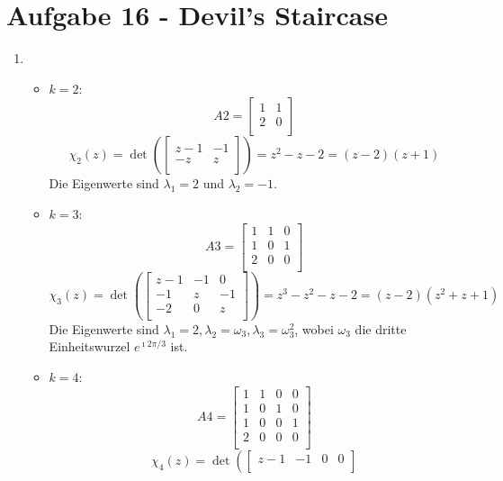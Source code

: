\section*{Aufgabe 16 - Devil's Staircase}
\begin{enumerate}
\item
	\begin{itemize}
		\item $k= 2$: 
			\[ A2 = \begin{bmatrix}
					1 & 1 \\
					2 & 0 \\
				\end{bmatrix} \]
			\[ \chi_2(z) = \det \left( 
				\begin{bmatrix}
					z - 1 & -1 \\
					-z    & z  \\
				\end{bmatrix} \right) =
				z^2 - z - 2 = (z-2)(z+1) \]
			Die Eigenwerte sind $\lambda_1 = 2$ und $\lambda_2 = -1$.
		\item $k = 3$:
			\[ A3 = \begin{bmatrix}
					1 & 1 & 0 \\
					1 & 0 & 1 \\
					2 & 0 & 0 \\
				\end{bmatrix} \]
			\[ \chi_3(z) = \det \left(
				\begin{bmatrix}
					z-1 & -1 & 0 \\
					-1 & z & -1 \\
					-2 & 0 & z \\
				\end{bmatrix} \right) =
				z^3 - z^2 - z - 2 = (z-2)(z^2 + z + 1) \]
			Die Eigenwerte sind $\lambda_1 = 2, \lambda_2 = \omega_3, \lambda_3 = \omega_3^2 $,
			wobei $\omega_3$ die dritte Einheitswurzel $e^{\imath 2 \pi / 3}$ ist.
		\item $k = 4$:
			\[ A4 =	\begin{bmatrix}
					1 & 1 & 0 & 0 \\
					1 & 0 & 1 & 0 \\
					1 & 0 & 0 & 1 \\
					2 & 0 & 0 & 0 \\
				\end{bmatrix} \]
			\[ \chi_4(z) = \det \left(
				\begin{bmatrix}
					z-1 & -1 & 0 & 0 \\

\end{bmatrix}\]
\end{itemize}
\end{enumerate}
